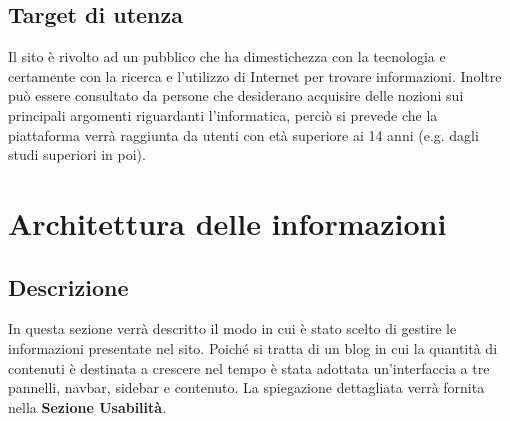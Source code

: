 \documentclass[12pt]{article}
\begin{document}
	\subsection{Target di utenza}
		Il sito è rivolto ad un pubblico che ha dimestichezza con la tecnologia e certamente con la ricerca e l'utilizzo di Internet per trovare informazioni. Inoltre può essere consultato da persone che desiderano acquisire delle nozioni sui principali argomenti riguardanti l'informatica, perciò si prevede che la piattaforma verrà raggiunta da utenti con età superiore ai 14 anni (e.g. dagli studi superiori in poi).
		
	\section{Architettura delle informazioni}
	\subsection{Descrizione}
		In questa sezione verrà descritto il modo in cui è stato scelto di gestire le informazioni presentate nel sito. Poiché si tratta di un blog in cui la quantità di contenuti è destinata a crescere nel tempo è stata adottata un'interfaccia a tre pannelli, navbar, sidebar e contenuto. La spiegazione dettagliata verrà fornita nella \textbf{Sezione \textbf{Usabilità}}.
\end{document}
